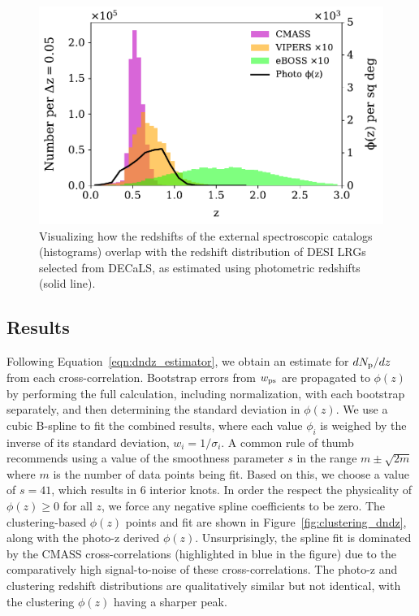 \begin{figure}
\centering
\includegraphics[width=\linewidth]{figures/spectro_overlapping_z.pdf}
\caption{Visualizing how the redshifts of the external spectroscopic catalogs (histograms) overlap with the redshift distribution of DESI LRGs selected from DECaLS, as estimated using photometric redshifts (solid line).}
\label{fig:spectro_overlap}
\end{figure}

\subsection{Results}

Following Equation~\ref{eqn:dndz_estimator}, we obtain an estimate for $dN_{\rm p}/dz$ from each cross-correlation. Bootstrap errors from $w_{\rm ps}$ are propagated to $\phi(z)$ by performing the full calculation, including normalization, with each bootstrap separately, and then determining the standard deviation in $\phi(z)$. We use a cubic B-spline to fit the combined results, where each value $\phi_i$ is weighed by the inverse of its standard deviation, $w_i = 1/\sigma_i$. 
A common rule of thumb recommends using a value of the smoothness parameter $s$ in the range $m \pm \sqrt{2m}$ where $m$ is the number of data points being fit. Based on this, we choose a value of $s = 41$, which results in 6 interior knots. In order the respect the physicality of $\phi(z) \ge 0$ for all $z$, we force any negative spline coefficients to be zero. The clustering-based $\phi(z)$ points and fit are shown in Figure~\ref{fig:clustering_dndz}, along with the photo-z derived $\phi(z)$. Unsurprisingly, the spline fit is dominated by the CMASS cross-correlations (highlighted in blue in the figure) due to the comparatively high signal-to-noise of these cross-correlations. The photo-z and clustering redshift distributions are qualitatively similar but not identical, with the clustering $\phi(z)$ having a sharper peak.

